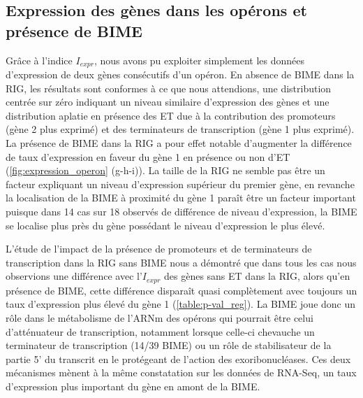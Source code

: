 \documentclass[12pt,a4paper]{report}
\begin{document}
\begin{onehalfspace}
\section*{Expression des gènes dans les opérons et présence de BIME}

Grâce à l'indice $I_{expr}$, nous avons pu exploiter simplement les données d'expression de deux gènes consécutifs d'un opéron. En absence de BIME dans la RIG, les résultats sont conformes à ce que nous attendions, une distribution centrée sur zéro indiquant un niveau similaire d'expression des gènes et une distribution aplatie en présence des ET due à la contribution des promoteurs (gène 2 plus exprimé) et des terminateurs de transcription (gène 1 plus exprimé). La présence de BIME dans la RIG a pour effet notable d'augmenter la différence de taux d'expression en faveur du gène 1 en présence ou non d'ET (\autoref{fig:expression_operon} (g-h-i)). La taille de la RIG ne semble pas être un facteur expliquant un niveau d'expression supérieur du premier gène, en revanche la localisation de la BIME à proximité du gène 1 paraît être un facteur important puisque dans 14 cas sur 18 observés de différence de niveau d'expression, la BIME se localise plus près du gène possédant le niveau d'expression le plus élevé.

L'étude de l'impact de la présence de promoteurs et de terminateurs de transcription dans la RIG sans BIME nous a démontré que dans tous les cas nous observions une différence avec l'$I_{expr}$ des gènes sans ET dans la RIG, alors qu'en présence de BIME, cette différence disparaît quasi complètement avec toujours un taux d'expression plus élevé du gène 1 (\autoref{table:p-val_reg}). La BIME joue donc un rôle dans le métabolisme de l'ARNm des opérons qui pourrait être celui d'atténuateur de transcription, notamment lorsque celle-ci chevauche un terminateur de transcription (14/39 BIME) ou un rôle de stabilisateur de la partie 5' du transcrit en le protégeant de l'action des exoribonucléases. Ces deux mécanismes mènent à la même constatation sur les données de RNA-Seq, un taux d'expression plus important du gène en amont de la BIME.


\end{onehalfspace}
\end{document}
